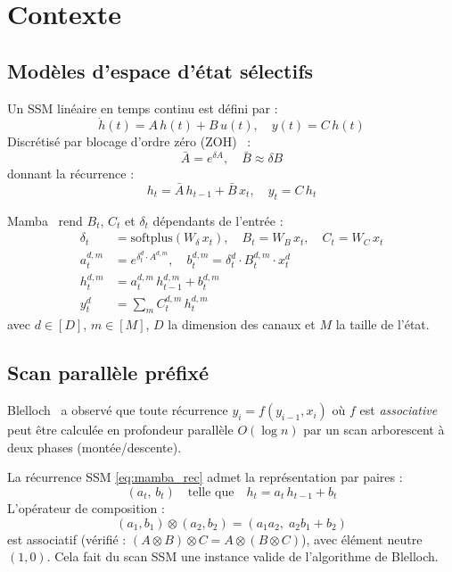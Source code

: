 \documentclass[10pt,onecolumn]{article}
\begin{document}
\section{Contexte}

\subsection{Modèles d'espace d'état sélectifs}

Un SSM linéaire en temps continu est défini par :
\begin{equation}
  \dot{h}(t) = A\,h(t) + B\,u(t), \quad y(t) = C\,h(t)
\end{equation}
Discrétisé par blocage d'ordre zéro (ZOH)~\cite{s4} :
\begin{equation}
  \bar{A} = e^{\delta A}, \quad
  \bar{B} \approx \delta B
\end{equation}
donnant la récurrence :
\begin{equation}
  h_t = \bar{A}\,h_{t-1} + \bar{B}\,x_t, \quad y_t = C\,h_t
\end{equation}

Mamba~\cite{mamba2023} rend $B_t$, $C_t$ et $\delta_t$ dépendants de l'entrée :
\begin{align}
  \delta_t &= \text{softplus}(W_\delta\, x_t), \quad
  B_t = W_B\, x_t, \quad
  C_t = W_C\, x_t \\
  a_t^{d,m} &= e^{\delta_t^d \cdot A^{d,m}}, \quad
  b_t^{d,m}  = \delta_t^d \cdot B_t^{d,m} \cdot x_t^d \label{eq:mamba_ab}\\
  h_t^{d,m} &= a_t^{d,m}\,h_{t-1}^{d,m} + b_t^{d,m} \label{eq:mamba_rec}\\
  y_t^d     &= \textstyle\sum_m C_t^{d,m}\,h_t^{d,m} \label{eq:mamba_out}
\end{align}
avec $d \in [D]$, $m \in [M]$, $D$ la dimension des canaux et $M$ la taille de l'état.

\subsection{Scan parallèle préfixé}
\label{sec:blelloch_bg}

Blelloch~\cite{blelloch1990} a observé que toute récurrence
$y_i = f(y_{i-1}, x_i)$ où $f$ est \emph{associative} peut être
calculée en profondeur parallèle $O(\log n)$ par un scan arborescent
à deux phases (montée/descente).

La récurrence SSM \eqref{eq:mamba_rec} admet la représentation par paires :
\begin{equation}
  (a_t,\, b_t) \quad\text{telle que}\quad h_t = a_t\,h_{t-1} + b_t
\end{equation}
L'opérateur de composition :
\begin{equation}
  \boxed{(a_1, b_1) \otimes (a_2, b_2) = (a_1 a_2,\; a_2 b_1 + b_2)}
  \label{eq:monoid}
\end{equation}
est associatif (vérifié : $(A \otimes B) \otimes C = A \otimes (B \otimes C)$),
avec élément neutre $(1, 0)$.
Cela fait du scan SSM une instance valide de l'algorithme de Blelloch.
\end{document}
